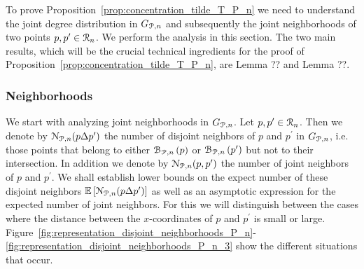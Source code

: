 To prove Proposition~\ref{prop:concentration_tilde_T_P_n} we need to understand the joint degree distribution in $G_{{\mathcal P},n}$ and subsequently the joint neighborhoods of two points $p, p^\prime \in {\mathcal R}_n$. We perform the analysis in this section. The two main results, which will be the crucial technical ingredients for the proof of Proposition~\ref{prop:concentration_tilde_T_P_n}, are Lemma ?? and Lemma ??.

\subsubsection*{Neighborhoods}

We start with analyzing joint neighborhoods in $G_{{\mathcal P},n}$. Let $p, p^\prime \in {\mathcal R}_n$. Then we denote by ${\mathcal N}_{{\mathcal P},n}(p\Delta p^\prime)$ the number of disjoint neighbors of $p$ and $p^\prime$ in $G_{{\mathcal P},n}$, i.e. those points that belong to either ${\mathcal B}_{{\mathcal P},n}\left(p\right)$ or ${\mathcal B}_{{\mathcal P},n}\left(p^\prime\right)$ but not to their intersection. In addition we denote by ${\mathcal N}_{{\mathcal P},n}(p,p^\prime)$ the number of joint neighbors of $p$ and $p^\prime$. We shall establish lower bounds on the expect number of these disjoint neighbors $\mathbb{E}\left[{\mathcal N}_{{\mathcal P},n}(p\Delta p^\prime)\right]$ as well as an asymptotic expression for the expected number of joint neighbors. For this we will distinguish between the cases where the distance between the $x$-coordinates of $p$ and $p^\prime$ is small or large. Figure~\ref{fig:representation_disjoint_neighborhoods_P_n}-\ref{fig:representation_disjoint_neighborhoods_P_n_3} show the different situations that occur.

